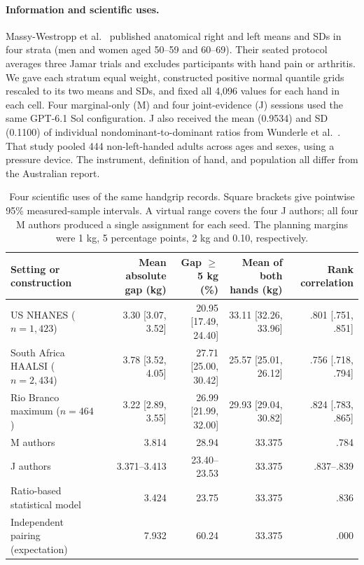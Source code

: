 \paragraph{Information and scientific uses.}
Massy-Westropp et al.~\cite{grip_adelaide} published anatomical right and left means and SDs in four strata (men and women aged 50--59 and 60--69). Their seated protocol averages three Jamar trials and excludes participants with hand pain or arthritis. We gave each stratum equal weight, constructed positive normal quantile grids rescaled to its two means and SDs, and fixed all 4,096 values for each hand in each cell. Four marginal-only (M) and four joint-evidence (J) sessions used the same GPT-6.1 Sol configuration. J also received the mean (0.9534) and SD (0.1100) of individual nondominant-to-dominant ratios from Wunderle et al.~\cite{grip_ratio}. That study pooled 444 non-left-handed adults across ages and sexes, using a pressure device. The instrument, definition of hand, and population all differ from the Australian report.

\begin{table}[t]
\caption{Four scientific uses of the same handgrip records. Square brackets give pointwise 95\% measured-sample intervals. A virtual range covers the four J authors; all four M authors produced a single assignment for each seed. The planning margins were 1 kg, 5 percentage points, 2 kg and 0.10, respectively.}
\label{tab:grip}
\centering\small
\begin{tabular}{lrrrr}\toprule
Setting or construction & Mean absolute gap (kg) & Gap $\geq$5 kg (\%) & Mean of both hands (kg) & Rank correlation\\\midrule
US NHANES ($n=1{,}423$) & 3.30 [3.07, 3.52] & 20.95 [17.49, 24.40] & 33.11 [32.26, 33.96] & .801 [.751, .851]\\
South Africa HAALSI ($n=2{,}434$) & 3.78 [3.52, 4.05] & 27.71 [25.00, 30.42] & 25.57 [25.01, 26.12] & .756 [.718, .794]\\
Rio Branco maximum ($n=464$) & 3.22 [2.89, 3.55] & 26.99 [21.99, 32.00] & 29.93 [29.04, 30.82] & .824 [.783, .865]\\\midrule
M authors & 3.814 & 28.94 & 33.375 & .784\\
J authors & 3.371--3.413 & 23.40--23.53 & 33.375 & .837--.839\\
Ratio-based statistical model & 3.424 & 23.75 & 33.375 & .836\\
Independent pairing (expectation) & 7.932 & 60.24 & 33.375 & .000\\\bottomrule
\end{tabular}
\end{table}

